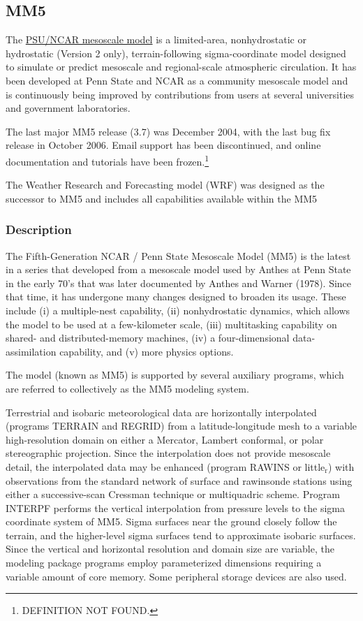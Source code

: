 \documentclass[11pt]{article}
\begin{document}
\subsection{MM5}
\label{sec-2-3}

The \href{http://www.mmm.ucar.edu/mm5/}{PSU/NCAR mesoscale model} is a limited-area, nonhydrostatic or
hydrostatic (Version 2 only), terrain-following sigma-coordinate
model designed to simulate or predict mesoscale and regional-scale
atmospheric circulation. It has been developed at Penn State and
NCAR as a community mesoscale model and is continuously being
improved by contributions from users at several universities and
government laboratories.

The last major MM5 release (3.7) was December 2004, with the last bug
fix release in October 2006. Email support has been discontinued, and
online documentation and tutorials have been frozen.\footnote{DEFINITION NOT FOUND.}

The Weather Research and Forecasting model (WRF) was designed as the
successor to MM5 and includes all capabilities available within the
MM5

\subsubsection{Description}
\label{sec-2-3-1}

The Fifth-Generation NCAR / Penn State Mesoscale Model (MM5) is
the latest in a series that developed from a mesoscale model used
by Anthes at Penn State in the early 70's that was later
documented by Anthes and Warner (1978). Since that time, it has
undergone many changes designed to broaden its usage. These
include (i) a multiple-nest capability, (ii) nonhydrostatic
dynamics, which allows the model to be used at a few-kilometer
scale, (iii) multitasking capability on shared- and
distributed-memory machines, (iv) a four-dimensional
data-assimilation capability, and (v) more physics options.

The model (known as MM5) is supported by several auxiliary
programs, which are referred to collectively as the MM5 modeling
system.  

Terrestrial and isobaric meteorological data are horizontally
interpolated (programs TERRAIN and REGRID) from a
latitude-longitude mesh to a variable high-resolution domain on
either a Mercator, Lambert conformal, or polar stereographic
projection. Since the interpolation does not provide mesoscale
detail, the interpolated data may be enhanced (program RAWINS or
little$_{\text{r}}$) with observations from the standard network of surface
and rawinsonde stations using either a successive-scan Cressman
technique or multiquadric scheme. Program INTERPF performs the
vertical interpolation from pressure levels to the sigma
coordinate system of MM5. Sigma surfaces near the ground closely
follow the terrain, and the higher-level sigma surfaces tend to
approximate isobaric surfaces. Since the vertical and horizontal
resolution and domain size are variable, the modeling package
programs employ parameterized dimensions requiring a variable
amount of core memory. Some peripheral storage devices are also
used.
\end{document}
